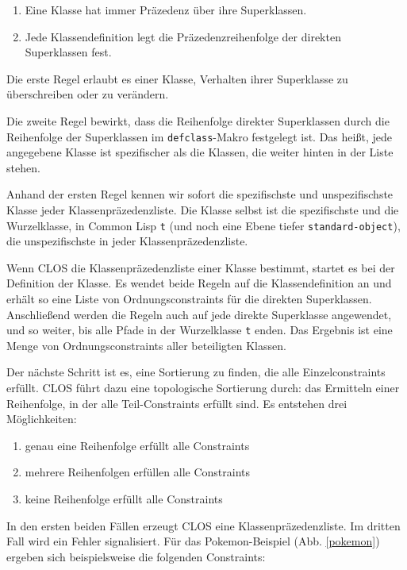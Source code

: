 \begin{enumerate}
 \item Eine Klasse hat immer Präzedenz über ihre Superklassen.
 \item Jede Klassendefinition legt die Präzedenzreihenfolge der direkten Superklassen fest.
\end{enumerate}

Die erste Regel erlaubt es einer Klasse, Verhalten ihrer Superklasse zu überschreiben oder zu verändern.

Die zweite Regel bewirkt, dass die Reihenfolge direkter Superklassen durch die Reihenfolge der Superklassen im \texttt{defclass}-Makro festgelegt ist. Das heißt, jede angegebene Klasse ist spezifischer als die Klassen, die weiter hinten in der Liste stehen.

Anhand der ersten Regel kennen wir sofort die spezifischste und unspezifischste Klasse jeder Klassenpräzedenzliste. Die Klasse selbst ist die spezifischste und die Wurzelklasse, in Common Lisp \texttt{t} (und noch eine Ebene tiefer \texttt{standard-object}), die unspezifischste in jeder Klassenpräzedenzliste.

Wenn CLOS die Klassenpräzedenzliste einer Klasse bestimmt, startet es bei der Definition der Klasse. Es wendet beide Regeln auf die Klassendefinition an und erhält so eine Liste von Ordnungsconstraints für die direkten Superklassen. Anschließend werden die Regeln auch auf jede direkte Superklasse angewendet, und so weiter, bis alle Pfade in der Wurzelklasse \texttt{t} enden. Das Ergebnis ist eine Menge von Ordnungsconstraints aller beteiligten Klassen.

Der nächste Schritt ist es, eine Sortierung zu finden, die alle Einzelconstraints erfüllt. CLOS führt dazu eine topologische Sortierung durch: das Ermitteln einer Reihenfolge, in der alle Teil-Constraints erfüllt sind. Es entstehen drei Möglichkeiten:
\begin{enumerate}
 \item genau eine Reihenfolge erfüllt alle Constraints
 \item mehrere Reihenfolgen erfüllen alle Constraints
 \item keine Reihenfolge erfüllt alle Constraints
\end{enumerate}

In den ersten beiden Fällen erzeugt CLOS eine Klassenpräzedenzliste. Im dritten Fall wird ein Fehler signalisiert. Für das Pokemon-Beispiel (Abb. \ref{pokemon}) ergeben sich beispielsweise die folgenden Constraints:

